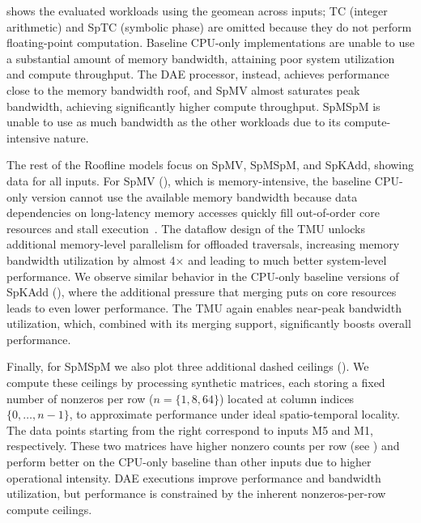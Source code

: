  shows the evaluated workloads using the geomean across inputs; TC (integer arithmetic) and SpTC (symbolic phase) are omitted because they do not perform floating-point computation. Baseline CPU-only implementations are unable to use a substantial amount of memory bandwidth, attaining poor system utilization and compute throughput. The DAE processor, instead, achieves performance close to the memory bandwidth roof, and SpMV almost saturates peak bandwidth, achieving significantly higher compute throughput. SpMSpM is unable to use as much bandwidth as the other workloads due to its compute-intensive nature.

The rest of the Roofline models focus on SpMV, SpMSpM, and SpKAdd, showing data for all inputs. For SpMV (), which is memory-intensive, the baseline CPU-only version cannot use the available memory bandwidth because data dependencies on long-latency memory accesses quickly fill out-of-order core resources and stall execution~\cite{esmailidokht2024micro}. The dataflow design of the TMU unlocks additional memory-level parallelism for offloaded traversals, increasing memory bandwidth utilization by almost 4$\times$ and leading to much better system-level performance. We observe similar behavior in the CPU-only baseline versions of SpKAdd (), where the additional pressure that merging puts on core resources leads to even lower performance. The TMU again enables near-peak bandwidth utilization, which, combined with its merging support, significantly boosts overall performance.

Finally, for SpMSpM we also plot three additional dashed ceilings (). We compute these ceilings by processing synthetic matrices, each storing a fixed number of nonzeros per row ($n=\{1,8,64\}$) located at column indices $\{0,\ldots,n-1\}$, to approximate performance under ideal spatio-temporal locality. The data points starting from the right correspond to inputs M5 and M1, respectively. These two matrices have higher nonzero counts per row (see ) and perform better on the CPU-only baseline than other inputs due to higher operational intensity. DAE executions improve performance and bandwidth utilization, but performance is constrained by the inherent nonzeros-per-row compute ceilings.

